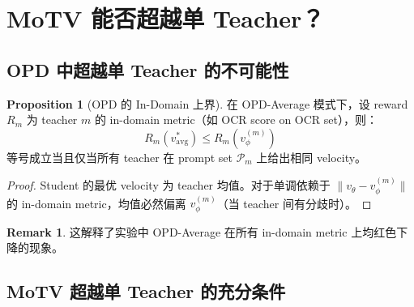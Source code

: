 \documentclass[11pt,a4paper]{article}
\newcommand{\vtheta}{v_\theta}
\newcommand{\vphi}{v_\phi}
\theoremstyle{definition}
\newtheorem{remark}{Remark}
\newtheorem{proposition}{Proposition}
\begin{document}
\section{MoTV 能否超越单 Teacher？}
\label{sec:beyond_single}

\subsection{OPD 中超越单 Teacher 的不可能性}

\begin{proposition}[OPD 的 In-Domain 上界]
在 OPD-Average 模式下，设 reward $R_m$ 为 teacher $m$ 的 in-domain metric（如 OCR score on OCR set），则：
\begin{equation}
R_m\!\left(v^*_{\mathrm{avg}}\right) \leq R_m\!\left(\vphi^{(m)}\right)
\end{equation}
等号成立当且仅当所有 teacher 在 prompt set $\mathcal{P}_m$ 上给出相同 velocity。
\end{proposition}

\begin{proof}
Student 的最优 velocity 为 teacher 均值。对于单调依赖于 $\|\vtheta - \vphi^{(m)}\|$ 的 in-domain metric，均值必然偏离 $\vphi^{(m)}$（当 teacher 间有分歧时）。
\end{proof}

\begin{remark}
这解释了实验中 OPD-Average 在所有 in-domain metric 上均红色下降的现象。
\end{remark}

\subsection{MoTV 超越单 Teacher 的充分条件}
\end{document}
